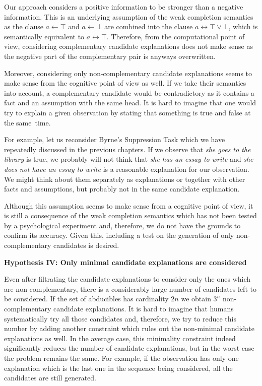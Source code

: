 Our approach considers a positive information to be stronger than a negative information. This is an underlying assumption of the weak completion semantics as the clause $a \leftarrow \top$ and $a \leftarrow \bot$ are combined into the clause $a \leftrightarrow \top \vee \bot$, which is semantically equivalent to $a \leftrightarrow \top$. Therefore, from the computational point of view, considering complementary candidate explanations does not make sense as the negative part of the complementary pair is anyways overwritten.

Moreover, considering only non-complementary candidate explanations seems to make sense from the cognitive point of view as well. If we take their semantics into account, a complementary candidate would be contradictory as it contains a fact and an assumption with the same head. It is hard to imagine that one would try to explain a given observation by stating that something is true and false at the same~time. 

For example, let us reconsider Byrne's Suppression Task which we have repeatedly discussed in the previous chapters. If we observe that \textit{she goes to the library} is true, we probably will not think that \textit{she has an essay to write} and \textit{she does not have an essay to write} is a reasonable explanation for our observation. We might think about them separately as explanations or together with other facts and assumptions, but probably not in the same candidate explanation.

Although this assumption seems to make sense from a cognitive point of view, it is still a consequence of the weak completion semantics which has not been tested by a psychological experiment and, therefore, we do not have the grounds to confirm its accuracy. Given this, including a test on the generation of only non-complementary candidates is desired.

\textbf{Hypothesis IV: Only minimal candidate explanations are considered}

Even after filtrating the candidate explanations to consider only the ones which are non-complementary, there is a considerably large number of candidates left to be considered. If the set of abducibles has cardinality $2n$
 we obtain $3^n$ non-complementary candidate explanations. It is hard to imagine that humans systematically try all those candidates and, therefore, we try to reduce this number by adding another constraint which rules out the non-minimal candidate explanations as well. In the average case, this minimality constraint indeed significantly reduces the number of candidate explanations, but in the worst case the problem remains the same. For example, if the observation has only one explanation which is the last one in the sequence being considered, all the candidates are still generated.
 

